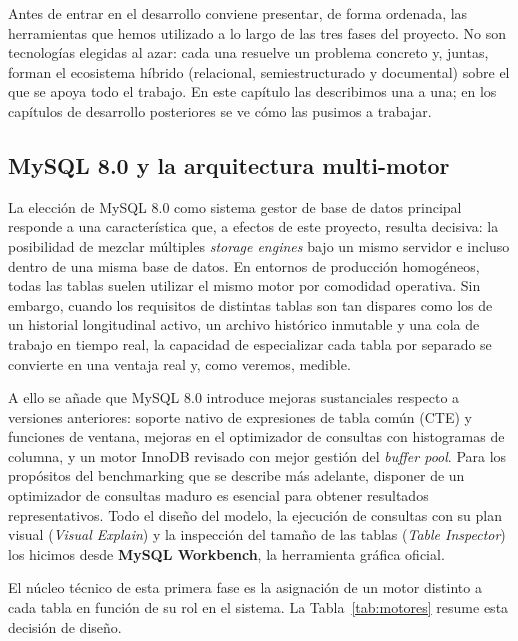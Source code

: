 \documentclass[../main.tex]{subfiles}
\begin{document}
Antes de entrar en el desarrollo conviene presentar, de forma ordenada, las herramientas que hemos utilizado a lo largo de las tres fases del proyecto. No son tecnologías elegidas al azar: cada una resuelve un problema concreto y, juntas, forman el ecosistema híbrido (relacional, semiestructurado y documental) sobre el que se apoya todo el trabajo. En este capítulo las describimos una a una; en los capítulos de desarrollo posteriores se ve cómo las pusimos a trabajar.

\subsection{MySQL 8.0 y la arquitectura multi-motor}

La elección de MySQL 8.0 como sistema gestor de base de datos principal responde a una característica que, a efectos de este proyecto, resulta decisiva: la posibilidad de mezclar múltiples \textit{storage engines} bajo un mismo servidor e incluso dentro de una misma base de datos. En entornos de producción homogéneos, todas las tablas suelen utilizar el mismo motor por comodidad operativa. Sin embargo, cuando los requisitos de distintas tablas son tan dispares como los de un historial longitudinal activo, un archivo histórico inmutable y una cola de trabajo en tiempo real, la capacidad de especializar cada tabla por separado se convierte en una ventaja real y, como veremos, medible.

A ello se añade que MySQL 8.0 introduce mejoras sustanciales respecto a versiones anteriores: soporte nativo de expresiones de tabla común (CTE) y funciones de ventana, mejoras en el optimizador de consultas con histogramas de columna, y un motor InnoDB revisado con mejor gestión del \textit{buffer pool}. Para los propósitos del benchmarking que se describe más adelante, disponer de un optimizador de consultas maduro es esencial para obtener resultados representativos. Todo el diseño del modelo, la ejecución de consultas con su plan visual (\textit{Visual Explain}) y la inspección del tamaño de las tablas (\textit{Table Inspector}) los hicimos desde \textbf{MySQL Workbench}, la herramienta gráfica oficial.

El núcleo técnico de esta primera fase es la asignación de un motor distinto a cada tabla en función de su rol en el sistema. La Tabla~\ref{tab:motores} resume esta decisión de diseño.
\end{document}

